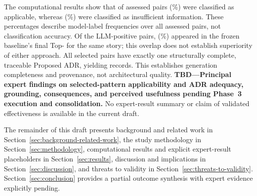 The computational results show that \StudyApplicableCount{} of
\StudyAssessmentCount{} assessed pairs (\RqOneApplicablePercent{}\%) were
classified as applicable, whereas \StudyInsufficientInformationCount{}
(\RqOneInsufficientInformationPercent{}\%) were classified as insufficient
information. These percentages describe model-label frequencies over all
assessed pairs, not classification accuracy. Of the
\StudyApplicableCount{} LLM-positive pairs, \StudyRagOverlapCount{}
(\RqTwoOverlapPercent{}\%) appeared in the frozen baseline's final
Top-\RagFinalCount{} for the same story; this overlap does not establish
superiority of either approach. All \StudyApplicableCount{} selected pairs
have exactly one structurally complete, traceable Proposed ADR, yielding
\StudyAdrCount{} records. This establishes generation completeness and
provenance, not architectural quality.
\textbf{TBD---Principal expert findings on selected-pattern applicability and
ADR adequacy, grounding, consequences, and perceived usefulness pending
Phase~3 execution and consolidation.}
No expert-result summary or claim of validated effectiveness is available
in the current draft.

The remainder of this draft presents background and related work in
Section~\ref{sec:background-related-work}, the study methodology in
Section~\ref{sec:methodology}, computational results and explicit expert-result
placeholders in Section~\ref{sec:results}, discussion and implications in
Section~\ref{sec:discussion}, and threats to validity in
Section~\ref{sec:threats-to-validity}. Section~\ref{sec:conclusion} provides
a partial outcome synthesis with expert evidence explicitly pending.

